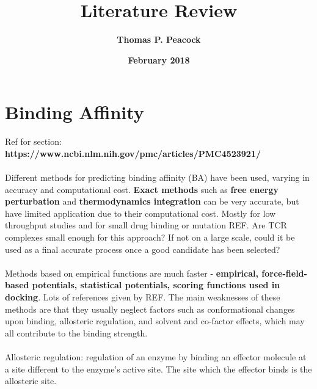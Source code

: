 \documentclass[12pt,a4paper]{article}
\begin{document}
	
	\title{\textbf{Literature Review}}
	\author{\textbf{Thomas P. Peacock}}
	\date{\textbf{February 2018}}
	\maketitle
	
\section{Binding Affinity}

Ref for section:\\ \textbf{https://www.ncbi.nlm.nih.gov/pmc/articles/PMC4523921/} 
\\
\\
Different methods for predicting binding affinity (BA) have been used, varying in accuracy and computational cost. \textbf{Exact methods} such as \textbf{free energy perturbation} and \textbf{thermodynamics integration} can be very accurate, but have limited application due to their computational cost. Mostly for low throughput studies and for small drug binding or mutation REF. Are TCR complexes small enough for this approach? If not on a large scale, could it be used as a final accurate process once a good candidate has been selected? 
\\
\\
Methods based on empirical functions are much faster - \textbf{empirical, force-field-based potentials, statistical potentials, scoring functions used in docking}. Lots of references given by REF. The main weaknesses of these methods are that they usually neglect factors such as conformational changes upon binding, allosteric regulation, and solvent and co-factor effects, which may all contribute to the binding strength.
\\
\\
Allosteric regulation: regulation of an enzyme by binding an effector molecule at a site different to the enzyme's active site. The site which the effector binds is the allosteric site.
\end{document}
